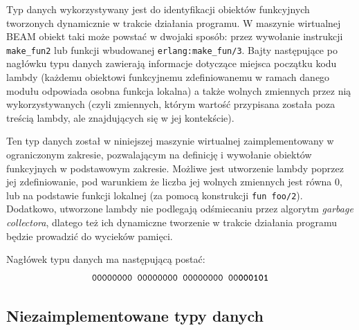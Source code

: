 Typ danych wykorzystywany jest do identyfikacji obiektów funkcyjnych tworzonych dynamicznie w trakcie działania programu.
W maszynie wirtualnej BEAM obiekt taki może powstać w dwojaki sposób: przez wywołanie instrukcji \texttt{make\_fun2} lub funkcji wbudowanej \texttt{erlang:make\_fun/3}.
Bajty następujące po nagłówku typu danych zawierają informacje dotyczące miejsca początku kodu lambdy (każdemu obiektowi funkcyjnemu zdefiniowanemu w ramach danego modułu odpowiada osobna funkcja lokalna) a także wolnych zmiennych przez nią wykorzystywanych (czyli zmiennych, którym wartość przypisana została poza treścią lambdy, ale znajdujących się w jej kontekście).

Ten typ danych został w niniejszej maszynie wirtualnej zaimplementowany w ograniczonym zakresie, pozwalającym na definicję i wywołanie obiektów funkcyjnych w podstawowym zakresie.
Możliwe jest utworzenie lambdy poprzez jej zdefiniowanie, pod warunkiem że liczba jej wolnych zmiennych jest równa 0, lub na podstawie funkcji lokalnej (za pomocą konstrukcji \texttt{fun foo/2}).
Dodatkowo, utworzone lambdy nie podlegają odśmiecaniu przez algorytm \emph{garbage collectora}, dlatego też ich dynamiczne tworzenie w trakcie działania programu będzie prowadzić do wycieków pamięci.

Nagłówek typu danych ma następującą postać:
$$\texttt{00000000 00000000 00000000 00\textbf{000101}}$$

\subsection{Niezaimplementowane typy danych}
\label{sub:typyNiezaimplementowane}

